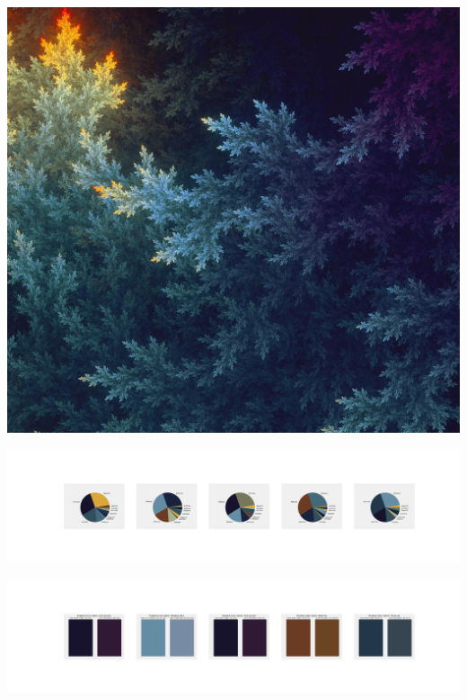 \documentclass[11pt]{article}
\begin{document}
\begin{landscape}
    \begin{center}
    \includegraphics[width=\textwidth]{./nbimg/file (127).jpg}
    \end{center}

    \begin{center}
    \includegraphics[width=250mm]{./nbimg/pie-31.jpg}
    \end{center}

    \begin{center}
    \includegraphics[width=250mm]{./nbimg/peak-31.jpg}
    \end{center}
    


\end{landscape}
\end{document}
